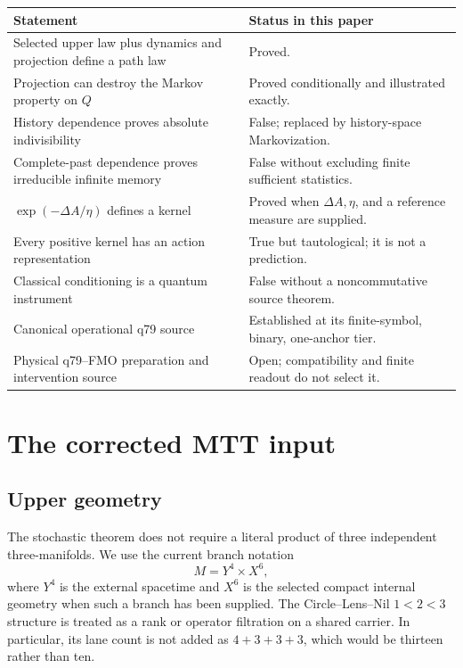 \documentclass[11pt]{article}
\theoremstyle{definition}
\theoremstyle{remark}
\begin{document}
\begin{center}
\begin{tabular}{p{}p{}}
\toprule
Statement & Status in this paper \\
\midrule
Selected upper law plus dynamics and projection define a path law
& Proved. \\
Projection can destroy the Markov property on \(Q\)
& Proved conditionally and illustrated exactly. \\
History dependence proves absolute indivisibility
& False; replaced by history-space Markovization. \\
Complete-past dependence proves irreducible infinite memory
& False without excluding finite sufficient statistics. \\
\(\exp(-\Delta A/\eta)\) defines a kernel
& Proved when \(\Delta A,\eta\), and a reference measure are supplied. \\
Every positive kernel has an action representation
& True but tautological; it is not a prediction. \\
Classical conditioning is a quantum instrument
& False without a noncommutative source theorem. \\
Canonical operational q79 source
& Established at its finite-symbol, binary, one-anchor tier. \\
Physical q79--FMO preparation and intervention source
& Open; compatibility and finite readout do not select it. \\
\bottomrule
\end{tabular}
\end{center}

\section{The corrected MTT input}

\subsection{Upper geometry}

The stochastic theorem does not require a literal product of three independent
three-manifolds.  We use the current branch notation
\[
M=Y^4\times X^6,
\]
where \(Y^4\) is the external spacetime and \(X^6\) is the selected compact
internal geometry when such a branch has been supplied.  The Circle--Lens--Nil
\(1<2<3\) structure is treated as a rank or operator filtration on a shared
carrier.  In particular, its lane count is not added as
\(4+3+3+3\), which would be thirteen rather than ten.
\end{document}
